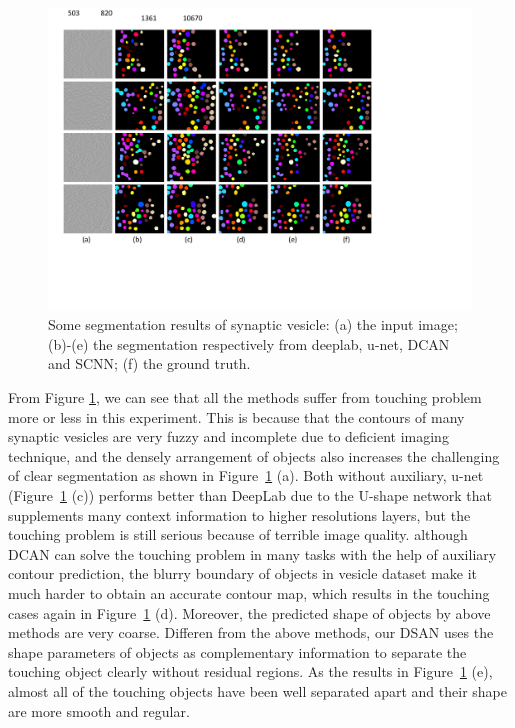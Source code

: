\begin{figure}
    \begin{center}
        \includegraphics[width=6.8in]{figures/FigVesicle.pdf}
    \end{center}
    \caption{Some segmentation results of synaptic vesicle: (a) the input image; (b)-(e) the segmentation respectively from deeplab, u-net, DCAN and SCNN; (f) the ground truth.}
    \label{FigVesicle}
\end{figure}

From Figure \ref{FigVesicle}, we can see that all the methods suffer from touching problem more or less in this experiment.
This is because that the contours of many synaptic vesicles are very fuzzy and incomplete due to deficient imaging technique, and the densely arrangement of objects also increases the challenging of clear segmentation as shown in Figure~\ref{FigVesicle} (a).
Both without auxiliary, u-net (Figure~\ref{FigVesicle} (c)) performs better than DeepLab due to the U-shape network that supplements many context information to higher resolutions layers, but the touching problem is still serious because of terrible image quality.
although DCAN can solve the touching problem in many tasks with the help of auxiliary contour prediction, the blurry boundary of objects in vesicle dataset make it much harder to obtain an accurate contour map, which results in the touching cases again in Figure~\ref{FigVesicle} (d).
Moreover, the predicted shape of objects by above methods are very coarse.
Differen from the above methods, our DSAN uses the shape parameters of objects as complementary information to separate the touching object clearly without residual regions.
As the results in Figure~\ref{FigVesicle} (e), almost all of the touching objects have been well separated apart and their shape are more smooth and regular.

